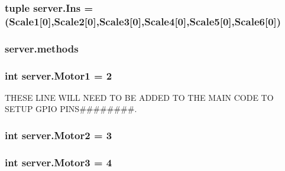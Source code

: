 \subsubsection[{\texorpdfstring{Ins}{Ins}}]{\setlength{\rightskip}{0pt plus 5cm}tuple server.\+Ins = ({\bf Scale1}\mbox{[}0\mbox{]},{\bf Scale2}\mbox{[}0\mbox{]},{\bf Scale3}\mbox{[}0\mbox{]},{\bf Scale4}\mbox{[}0\mbox{]},{\bf Scale5}\mbox{[}0\mbox{]},{\bf Scale6}\mbox{[}0\mbox{]})}\hypertarget{namespaceserver_a5cf9fd65fb4b3db36e9347a8000d6105}{}\label{namespaceserver_a5cf9fd65fb4b3db36e9347a8000d6105}
\subsubsection[{\texorpdfstring{methods}{methods}}]{\setlength{\rightskip}{0pt plus 5cm}server.\+methods}\hypertarget{namespaceserver_a26c653098c4b10df9e71ee2da680daee}{}\label{namespaceserver_a26c653098c4b10df9e71ee2da680daee}
\subsubsection[{\texorpdfstring{Motor1}{Motor1}}]{\setlength{\rightskip}{0pt plus 5cm}int server.\+Motor1 = 2}\hypertarget{namespaceserver_abf30f8bded9f548505f3493c335f2106}{}\label{namespaceserver_abf30f8bded9f548505f3493c335f2106}


T\+H\+E\+SE L\+I\+NE W\+I\+LL N\+E\+ED TO BE A\+D\+D\+ED TO T\+HE M\+A\+IN C\+O\+DE TO S\+E\+T\+UP G\+P\+IO P\+I\+NS\#\#\#\#\#\#\#\#. 

\subsubsection[{\texorpdfstring{Motor2}{Motor2}}]{\setlength{\rightskip}{0pt plus 5cm}int server.\+Motor2 = 3}\hypertarget{namespaceserver_a00295ebb36b4f5010bd865f7f79ed840}{}\label{namespaceserver_a00295ebb36b4f5010bd865f7f79ed840}
\subsubsection[{\texorpdfstring{Motor3}{Motor3}}]{\setlength{\rightskip}{0pt plus 5cm}int server.\+Motor3 = 4}\hypertarget{namespaceserver_ab9a64d256e338e60c642657f058fe711}{}\label{namespaceserver_ab9a64d256e338e60c642657f058fe711}
